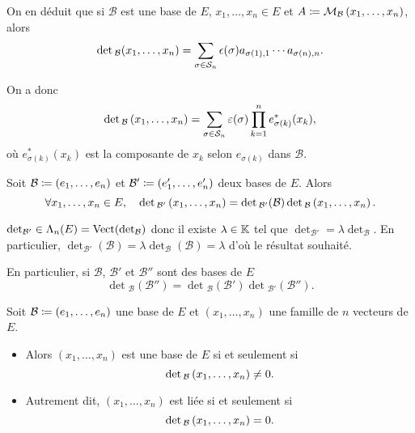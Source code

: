\documentclass{magnolia}
\begin{document}
\begin{remarqueUnique}
\remarque On en déduit que si $\mathcal{B}$ est une base de $E$, $x_1,\ldots,x_n\in E$ et
  $A\coloneqq \mathcal{M}_{\mathcal{B}}\left(x_1,\ldots,x_n\right)$, alors
  \[\det{}_{\mathcal{B}}(x_1,\ldots,x_n)=\sum_{\sigma\in\gsym{n}} \signat{\sigma}a_{\sigma(1),1}\cdots a_{\sigma(n),n}.\]
\end{remarqueUnique}

\begin{sol}
On a donc 
$$\mathop{\rm det}{}_{\mathcal{B}}\left(x_1,\ldots,x_n\right)=\sum_{\sigma\in \mathcal{S}_{n}}\varepsilon(\sigma)\prod_{k=1}^ne_{\sigma(k)}^*(x_k),$$
où $e_{\sigma(k)}^*(x_k)$ est la composante de $x_k$ selon $e_{\sigma(k)}$ dans $\mathcal{B}$.
\end{sol}

\begin{proposition}
Soit $\mathcal{B}\coloneqq\left(e_1,\ldots,e_n\right)$ et $\mathcal{B}'\coloneqq\left(e_1',\ldots,e_n'\right)$ deux
bases de $E$. Alors
\[\forall x_1,\ldots,x_n \in E ,\quad
  \mathop{\rm det}{}_{\mathcal{B}'}\left(x_1,\ldots,x_n\right)=\mathop{\rm det}{}_{\mathcal{B}'}(\mathcal{B})
  \mathop{\rm det}{}_{\mathcal{B}}\left(x_1,\ldots,x_n\right).\]
\end{proposition}

\begin{preuve}
$\mathop{\rm det}_{\mathcal{B}'}\in \Lambda_n(E)=\operatorname{Vect}(\mathop{\rm det}_{\mathcal{B}})$ donc il existe $\lambda \in \mathbb{K}$ tel que $\det_{\mathcal{B}'}=\lambda \det_{\mathcal{B}}$. En particulier, $\det_{\mathcal{B}'}(\mathcal{B})=\lambda\det_{\mathcal{B}}(\mathcal{B})=\lambda$ d'où le résultat souhaité.
\end{preuve}

\begin{remarqueUnique}
\remarque En particulier, si $\mathcal{B}$, $\mathcal{B}'$ et $\mathcal{B}''$
  sont des bases de $E$
  \[\det{}_{\mathcal{B}}(\mathcal{B}'')=\det{}_{\mathcal{B}}(\mathcal{B}')
    \det{}_{\mathcal{B}'}(\mathcal{B}'').\]
\end{remarqueUnique}

\begin{proposition}
  Soit $\mathcal{B}\coloneqq\left(e_1,\ldots,e_n\right)$ une base de $E$ et $(x_1,\ldots,x_n)$ une
  famille de $n$ vecteurs de $E$.
\begin{itemize}
\item Alors $(x_1,\ldots,x_n)$ est une base de $E$
  si et seulement si
  \[\mathop{\rm det}{}_{\mathcal{B}}\left(x_1,\ldots,x_n\right)\neq 0.\]
\item Autrement dit, $(x_1,\ldots,x_n)$ est liée si et seulement si
  \[\mathop{\rm det}{}_{\mathcal{B}}\left(x_1,\ldots,x_n\right)= 0.\]
\end{itemize}
  \end{proposition}
  
\end{document}
